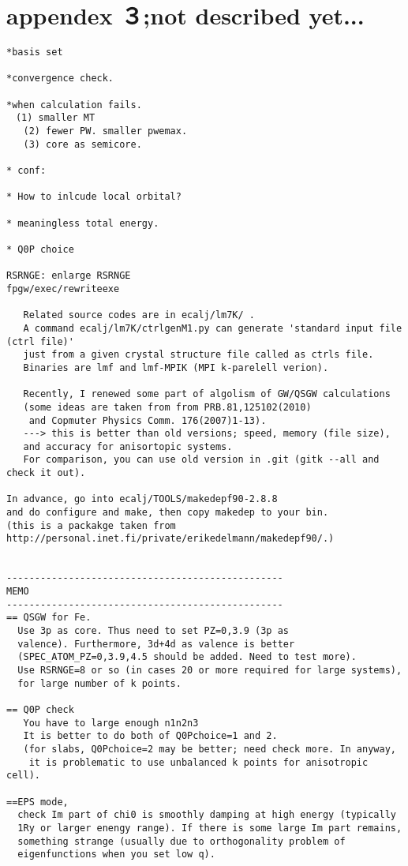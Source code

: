 \documentclass[a4paper,10pt,epsf,fleqn]{article}
\begin{document}
\section{appendex ３;not described yet...}
\begin{verbatim}
*basis set

*convergence check.

*when calculation fails.
　(1) smaller MT
   (2) fewer PW. smaller pwemax.
   (3) core as semicore.

* conf:

* How to inlcude local orbital?

* meaningless total energy.

* Q0P choice

RSRNGE: enlarge RSRNGE
fpgw/exec/rewriteexe

   Related source codes are in ecalj/lm7K/ .
   A command ecalj/lm7K/ctrlgenM1.py can generate 'standard input file (ctrl file)' 
   just from a given crystal structure file called as ctrls file. 
   Binaries are lmf and lmf-MPIK (MPI k-parelell verion).

   Recently, I renewed some part of algolism of GW/QSGW calculations
   (some ideas are taken from from PRB.81,125102(2010) 
    and Copmuter Physics Comm. 176(2007)1-13).
   ---> this is better than old versions; speed, memory (file size),
   and accuracy for anisortopic systems.
   For comparison, you can use old version in .git (gitk --all and check it out).

In advance, go into ecalj/TOOLS/makedepf90-2.8.8
and do configure and make, then copy makedep to your bin.
(this is a packakge taken from http://personal.inet.fi/private/erikedelmann/makedepf90/.)


-------------------------------------------------
MEMO
-------------------------------------------------
== QSGW for Fe.
  Use 3p as core. Thus need to set PZ=0,3.9 (3p as
  valence). Furthermore, 3d+4d as valence is better 
  (SPEC_ATOM_PZ=0,3.9,4.5 should be added. Need to test more). 
  Use RSRNGE=8 or so (in cases 20 or more required for large systems), 
  for large number of k points.

== Q0P check
   You have to large enough n1n2n3
   It is better to do both of Q0Pchoice=1 and 2.
   (for slabs, Q0Pchoice=2 may be better; need check more. In anyway,
    it is problematic to use unbalanced k points for anisotropic cell).

==EPS mode,
  check Im part of chi0 is smoothly damping at high energy (typically
  1Ry or larger enengy range). If there is some large Im part remains,
  something strange (usually due to orthogonality problem of
  eigenfunctions when you set low q).



\end{verbatim}
\end{document}
